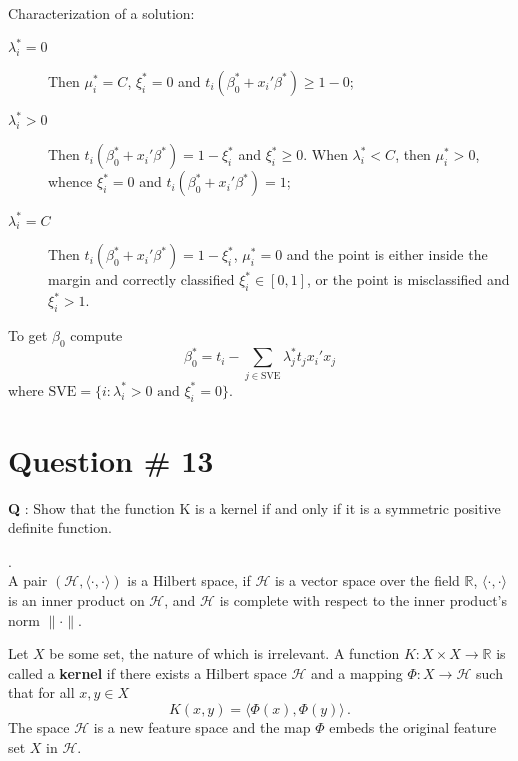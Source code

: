 \documentclass[a4paper]{article}
\newcommand{\Real}{\mathbb{R}}
\newcommand{\Hcal}{\mathcal{H}}
\begin{document}
Characterization of a solution:
\begin{description}
	\item[$\lambda^*_i = 0$] Then $\mu^*_i = C$, $\xi^*_i = 0$ and $t_i ( \beta^*_0 + x_i'\beta^* ) \geq 1 - 0$;
	\item[$\lambda^*_i > 0$] Then $t_i ( \beta^*_0 + x_i'\beta^* ) = 1 - \xi^*_i$ and $\xi^*_i \geq 0$.
		When $\lambda^*_i < C$, then $\mu^*_i > 0$, whence $\xi^*_i = 0$ and $t_i ( \beta^*_0 + x_i'\beta^* ) = 1$;
	\item[$\lambda^*_i = C$] Then $t_i ( \beta^*_0 + x_i'\beta^* ) = 1 - \xi^*_i$,
	$\mu^*_i=0$ and the point is either inside the margin and correctly classified
	$\xi^*_i \in [0,1]$, or the point is misclassified and $\xi^*_i > 1$.
\end{description}
To get $\beta_0$ compute 
\[ \beta^*_0 = t_i - \sum_{j\in\text{SVE}} \lambda^*_j t_j x_i'x_j \]
where $\text{SVE} = \{i: \lambda^*_i > 0 \text{ and } \xi^*_i = 0 \}$.



\clearpage

\section[RKHS]{Question \# 13} %
\label{sec:question_13}
\textbf{\large \textbf{Q}} : Show that the function K is a kernel if and only if
it is a symmetric positive definite function.

 .\hfill\\
A pair $(\Hcal, \langle\cdot,\cdot\rangle)$ is a Hilbert space, if  $\Hcal$ is a
vector space over the field $\Real$, $\langle\cdot,\cdot\rangle$ is an inner product
on $\Hcal$, and $\Hcal$ is complete with respect to the inner product's norm $\|\cdot\|$.

Let $X$ be some set, the nature of which is irrelevant. A function $K:X\times X\to \Real$
is called a \textbf{kernel} if there exists a Hilbert space $\Hcal$ and a mapping
$\Phi : X \to \Hcal$ such that for all $x,y\in X$
\[ K(x,y) = \bigl\langle \Phi(x), \Phi(y) \bigr\rangle \,. \]
The space $\Hcal$ is a new feature space and the map $\Phi$ embeds the original
feature set $X$ in $\Hcal$.
\end{document}
